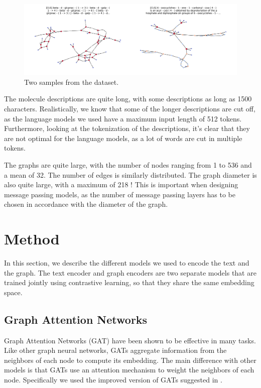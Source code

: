 \documentclass[switch, 12pt]{article}
\begin{document}
\begin{multicols}{2}
    \begin{figure}[H]
        \centering
        \includegraphics[width=\columnwidth]{figures/graphs.png}
        \caption{Two samples from the dataset.}
        \label{fig:dataset}
    \end{figure}

    The molecule descriptions are quite long, with some descriptions as long as 1500 characters. Realistically, we know that some of the longer descriptions are cut off, as the language models we used have a maximum input length of 512 tokens. Furthermore, looking at the tokenization of the descriptions, it's clear that they are not optimal for the language models, as a lot of words are cut in multiple tokens.

    The graphs are quite large, with the number of nodes ranging from 1 to 536 and a mean of 32. The number of edges is similarly distributed. The graph diameter is also quite large, with a maximum of 218 ! This is important when designing message passing models, as the number of message passing layers has to be chosen in accordance with the diameter of the graph.

    \section{Method}

    In this section, we describe the different models we used to encode the text and the graph. The text encoder and graph encoders are two separate models that are trained jointly using contrastive learning, so that they share the same embedding space.

    \subsection{Graph Attention Networks}

    Graph Attention Networks (GAT) \cite{velickovic-2018} have been shown to be effective in many tasks. Like other graph neural networks, GATs aggregate information from the neighbors of each node to compute its embedding. The main difference with other models is that GATs use an attention mechanism to weight the neighbors of each node. Specifically we used the improved version of GATs suggested in \cite{brody-2021}.


\end{multicols}
\end{document}
